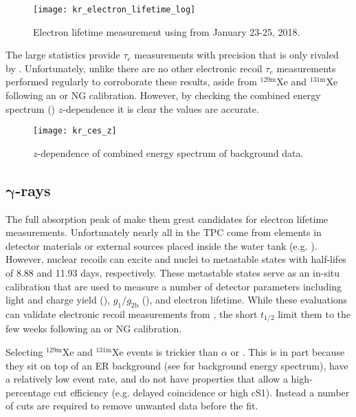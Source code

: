 \begin{figure}
\centering
\texttt{[image: kr\_electron\_lifetime\_log]}
\caption{Electron lifetime measurement using \metakr from January 23-25, 2018.}
\label{fig:electron_lifetimes_measurement_kr_elifetime}
\end{figure}

The large statistics provide $\tau_e$ measurements with precision that is only rivaled by .  Unfortunately, unlike
\alphadecays there are no other electronic recoil $\tau_e$ measurements performed regularly to corroborate these results, aside from
$\mathrm{^{129m}Xe}$ and $\mathrm{^{131m}Xe}$ following an \ambe or NG calibration.  However, by checking the combined energy spectrum
() $z$-dependence it is clear the values are accurate.

\begin{figure}
\centering
\texttt{[image: kr\_ces\_z]}
\caption{$z$-dependence of combined energy spectrum of background data.}
\label{fig:electron_lifetimes_measurement_kr_ces_z}
\end{figure}



\subsection{$\mathbf{\gamma}$-rays}
\label{subsec:electron_lifetimes_measurement_gammas}
The full absorption peak of \gammarays make them great candidates for electron lifetime measurements.  Unfortunately nearly all
\gammarays in the TPC come from elements in detector materials or external sources placed inside the water tank
(e.g. ).  However, nuclear recoils can excite  and  nuclei to metastable states with half-lifes
of 8.88 and 11.93 days, respectively.  These metastable states serve as an in-situ calibration that are used to measure a number of
detector parameters including light and charge yield (), $g_1/g_{2\mathrm{b}}$
(), and electron lifetime.  While these evaluations can validate
electronic recoil measurements from , the short $t_{1/2}$ limit them to the few weeks following an \ambe or NG
calibration.

Selecting $\mathrm{^{129m}Xe}$ and $\mathrm{^{131m}Xe}$ events is trickier than $\alpha$ or .  This is in part because they
sit
on top of an ER background (see  for background energy spectrum), have a
relatively low event rate, and do not have properties that allow a high-percentage cut
efficiency (e.g.  delayed coincidence or high \alphadecay cS1).  Instead a number of cuts are required
to remove unwanted data before the fit.


